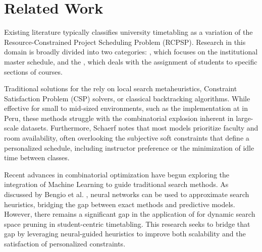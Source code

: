 
\section{Related Work}
Existing literature typically classifies university timetabling as a variation of the Resource-Constrained Project Scheduling Problem (RCPSP). Research in this domain is broadly divided into two categories: \ET, which focuses on the institutional master schedule, and the \SSP, which deals with the assignment of students to specific sections of courses.

Traditional solutions for the \SSP rely on local search metaheuristics, Constraint Satisfaction Problem (CSP) solvers, or classical backtracking algorithms. While effective for small to mid-sized environments, such as the implementation at \UNI in Peru, these methods struggle with the combinatorial explosion inherent in large-scale datasets. Furthermore, Schaerf \cite{ref1} notes that most \ET models prioritize faculty and room availability, often overlooking the subjective soft constraints that define a personalized schedule, including instructor preference or the minimization of idle time between classes.

Recent advances in combinatorial optimization have begun exploring the integration of Machine Learning to guide traditional search methods. As discussed by Bengio et al. \cite{ref3}, neural networks can be used to approximate search heuristics, bridging the gap between exact methods and predictive models. However, there remains a significant gap in the application of \DRL for dynamic search space pruning in student-centric timetabling. This research seeks to bridge that gap by leveraging neural-guided heuristics to improve both scalability and the satisfaction of personalized constraints.
